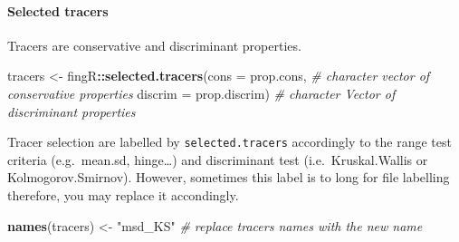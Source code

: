 \documentclass[
]{article}
\newenvironment{Shaded}{\begin{snugshade}}{\end{snugshade}}
\newcommand{\AttributeTok}[1]{\textcolor[rgb]{0.13,0.29,0.53}{#1}}
\newcommand{\CommentTok}[1]{\textcolor[rgb]{0.56,0.35,0.01}{\textit{#1}}}
\newcommand{\FunctionTok}[1]{\textcolor[rgb]{0.13,0.29,0.53}{\textbf{#1}}}
\newcommand{\NormalTok}[1]{#1}
\newcommand{\OtherTok}[1]{\textcolor[rgb]{0.56,0.35,0.01}{#1}}
\newcommand{\SpecialCharTok}[1]{\textcolor[rgb]{0.81,0.36,0.00}{\textbf{#1}}}
\newcommand{\StringTok}[1]{\textcolor[rgb]{0.31,0.60,0.02}{#1}}
\begin{document}
\hypertarget{selected-tracers}{%
\paragraph{Selected tracers}\label{selected-tracers}}

Tracers are conservative and discriminant properties.

\begin{Shaded}
\begin{Highlighting}[]
\NormalTok{tracers }\OtherTok{\textless{}{-}}\NormalTok{ fingR}\SpecialCharTok{::}\FunctionTok{selected.tracers}\NormalTok{(}\AttributeTok{cons =}\NormalTok{ prop.cons,        }\CommentTok{\# character vector of conservative properties}
                                   \AttributeTok{discrim =}\NormalTok{ prop.discrim)  }\CommentTok{\# character Vector of discriminant properties}
\end{Highlighting}
\end{Shaded}

\begin{Shaded}
\end{Shaded}

Tracer selection are labelled by \texttt{selected.tracers} accordingly
to the range test criteria (e.g.~mean.sd, hinge\ldots) and discriminant
test (i.e.~Kruskal.Wallis or Kolmogorov.Smirnov). However, sometimes
this label is to long for file labelling therefore, you may replace it
accondingly.

\begin{Shaded}
\begin{Highlighting}[]
\FunctionTok{names}\NormalTok{(tracers) }\OtherTok{\textless{}{-}} \StringTok{"msd\_KS"} \CommentTok{\# replace tracers names with the new name}
\end{Highlighting}
\end{Shaded}

\begin{Shaded}
\end{Shaded}
\end{document}
